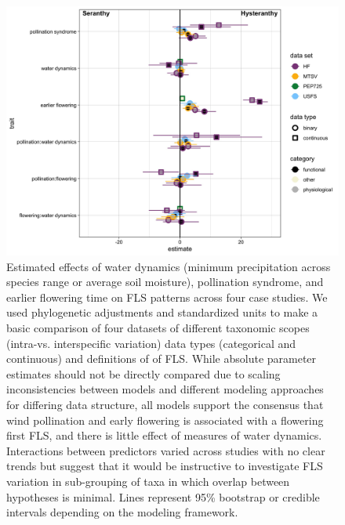 \documentclass[12pt]{article}
\begin{document}
        \begin{figure}[ht]
    \centering
    \includegraphics[width=\textwidth]{..//figure/allmods_effectsizes_combined.jpeg}
    \caption{Estimated effects of water dynamics (minimum precipitation across species range or average soil moisture), pollination syndrome, and earlier flowering time on FLS patterns across four case studies. We used phylogenetic adjustments and standardized units to make a basic comparison of four datasets of different taxonomic scopes (intra-vs. interspecific variation) data types (categorical and continuous) and definitions of of FLS. While absolute parameter estimates should not be directly compared due to scaling inconsistencies between models and different modeling approaches for differing data structure, all models support the consensus that wind pollination and early flowering is associated with a flowering first FLS, and there is little effect of measures of water dynamics. Interactions between predictors varied across studies with no clear trends but suggest that it would be instructive to investigate FLS variation in sub-grouping of taxa in which overlap between hypotheses is minimal. Lines represent 95\% bootstrap or credible intervals depending on the modeling framework.}
  \label{fig:Figure 4}
    \end{figure}
\end{document}
